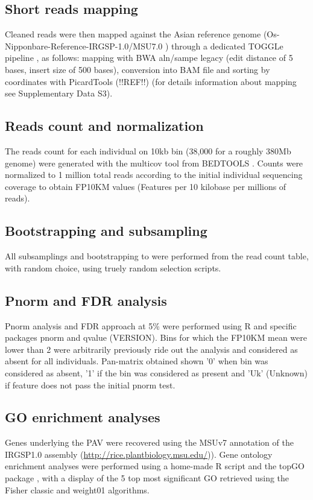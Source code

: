 \documentclass[10pt,letterpaper]{article}
\begin{document}
\subsection*{Short reads mapping}
Cleaned reads were then mapped against the Asian reference genome (Os-Nipponbare-Reference-IRGSP-1.0/MSU7.0 \cite{Mcnally2009, Kawahara2013}) through a dedicated TOGGLe pipeline \cite{Monat2015, Tranchant2018}, as follows: mapping with BWA aln/sampe legacy \cite{Li2009} (edit distance of 5 bases, insert size of 500 bases), conversion into BAM file and sorting by coordinates with PicardTools (!!REF!!) (for details information about mapping see Supplementary Data S3).


\subsection*{Reads count and normalization}
The reads count for each individual on 10kb bin (38,000 for a roughly 380Mb genome) were generated with the multicov tool from BEDTOOLS \cite{Quinlan2014}. Counts were normalized to 1 million total reads according to the initial individual sequencing coverage to obtain FP10KM values (Features per 10 kilobase per millions of reads).

\subsection*{Bootstrapping and subsampling}
All subsamplings and bootstrapping to were performed from the read count table, with random choice, using truely random selection scripts. 

\subsection*{Pnorm and FDR analysis}
Pnorm analysis and FDR approach at 5\% were performed using R and specific packages pnorm and qvalue \cite{Storey2015} (VERSION). Bins for which the FP10KM mean were lower than 2 were arbitrarily previously ride out the analysis and considered as absent for all individuals. Pan-matrix obtained shown '0' when bin was considered as absent,  '1' if the bin was considered as present and  'Uk' (Unknown) if feature does not pass the initial pnorm test.

\subsection*{GO enrichment analyses}
Genes underlying the PAV were recovered using the MSUv7 annotation of the IRGSP1.0 assembly (\url{http://rice.plantbiology.msu.edu/})). Gene ontology enrichment analyses were performed using a home-made R script and the topGO package \cite{Alexa2016}, with a display of the 5 top most significant GO retrieved using the Fisher classic and weight01 algorithms.
\end{document}
